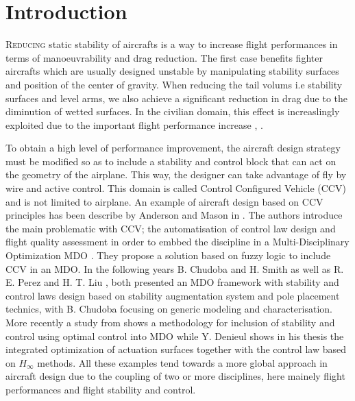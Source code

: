  \section{Introduction}
\lettrine{R}{educing} static stability of aircrafts is a way to increase flight performances in terms of manoeuvrability and drag reduction. The first case benefits fighter aircrafts which are usually designed unstable by manipulating stability surfaces and position of the center of gravity. When reducing the tail volums i.e stability surfaces and level arms, we also achieve a significant reduction in drag due to the diminution of wetted surfaces. In the civilian domain, this effect is increaslingly exploited due to the important flight performance increase \cite{HermanImpactControlConceptonDesign}, \cite{Abzug}.

To obtain a high level of performance improvement, the aircraft design strategy must be modified so as to include a stability and control block that can act on the geometry of the airplane. This way, the designer can take advantage of fly by wire and active control. This domain is called Control Configured Vehicle (CCV) and is not limited to airplane\cite{Abzug}. An example of aircraft design based on CCV principles has been describe by Anderson and Mason in \cite{Anderson_CCV_design}. The authors introduce the main problematic with CCV; the automatisation of control law design and flight quality assessment in order to embbed the discipline in a Multi-Disciplinary Optimization MDO . They propose a solution based on fuzzy logic to include CCV in an MDO. In the following years B. Chudoba and H. Smith \cite{Chudoba_generic_method} as well as R. E. Perez and H. T. Liu \cite{LiuPerezMDOFramework}, both presented an MDO framework with stability and control laws design based on stability augmentation system and pole placement technics, with B. Chudoba focusing on generic modeling and characterisation. More recently a study from \cite{WelsteadConceptualDesignAugmentedStability} shows a methodology for inclusion of stability and control using optimal control into MDO while Y. Denieul \cite{YannDenieul} shows in his thesis the integrated optimization of actuation surfaces together with the control law based on $H_\infty$ methods. All these examples tend towards a more global approach in aircraft design due to the coupling of two or more disciplines, here mainely flight performances and flight stability and control.

